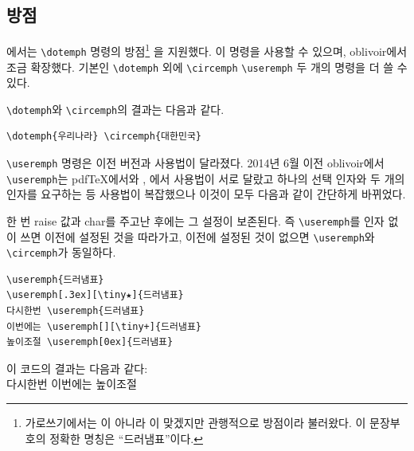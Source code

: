 \documentclass[
	12pt,
	a4paper,
	kosection,
	footnote,
	nobookmarks,
	microtype,
	figtabcapt,
]{oblivoir}
\def\cs#1{\texttt{\textbackslash #1}}
\def\xetexko{\XeTeX-\ko}
\def\luatexko{\LuaTeX-\ko}
\begin{document}
\subsection{방점}

\koTeX 에서는 \texttt{\textbackslash dotemph} 명령의 방점\footnote{%
	가로쓰기에서는  이 아니라
	이 맞겠지만 관행적으로 방점이라 불러왔다.
	이 문장부호의 정확한 명칭은 “드러냄표”이다.}%
을 지원했다.   이 명령을 사용할 수 있으며,
oblivoir에서 조금 확장했다. 기본인
\texttt{\textbackslash dotemph}
외에
\texttt{\textbackslash circemph}
\texttt{\textbackslash useremph}
두 개의 명령을 더 쓸 수 있다.

\cs{dotemph}와 \cs{circemph}의 결과는 다음과 같다.

\medskip

\noindent\begin{minipage}{.45\textwidth}
\begin{verbatim}
\dotemph{우리나라} \circemph{대한민국}
\end{verbatim}
\end{minipage}\hfill
\begin{minipage}{.45\textwidth}
 
\end{minipage}

\medskip

\cs{useremph} 명령은 이전 버전과 사용법이 달라졌다. 2014년 6월 이전 oblivoir에서
\cs{useremph}는 pdf\TeX 에서와 \XeTeX, \LuaTeX 에서 사용법이 서로 달랐고 
하나의 선택 인자와 두 개의 인자를 요구하는 등 사용법이 복잡했으나 이것이 모두 다음과 같이
간단하게 바뀌었다.
\begin{boxedverbatim}
\end{boxedverbatim}
한 번 raise 값과 char를 주고난 후에는 그 설정이 보존된다. 즉 \cs{useremph}를
인자 없이 쓰면 이전에 설정된 것을 따라가고, 이전에 설정된 것이 없으면 \cs{useremph}와
\cs{circemph}가 동일하다.

\begin{verbatim}
\useremph{드러냄표}
\useremph[.3ex][\tiny★]{드러냄표}
다시한번 \useremph{드러냄표}
이번에는 \useremph[][\tiny+]{드러냄표}
높이조절 \useremph[0ex]{드러냄표}
\end{verbatim}

이 코드의 결과는 다음과 같다:\\
 다시한번 
이번에는 
높이조절 
\end{document}
